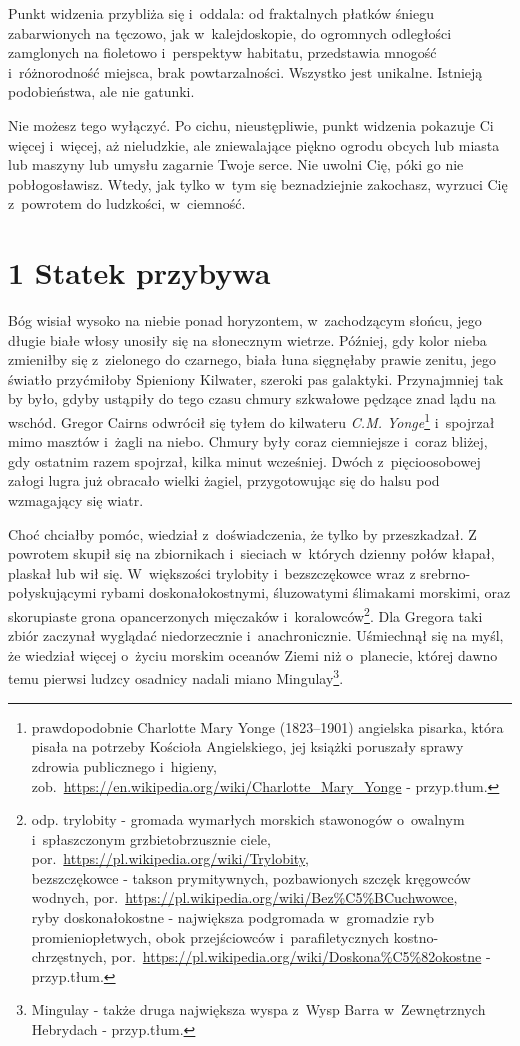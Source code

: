 \documentclass[oneside,polish,12pt,sfheadings]{mwbk}
\begin{document}
Punkt widzenia przybliża się i~oddala: od fraktalnych płatków śniegu
zabarwionych na tęczowo, jak w~kalejdoskopie, do ogromnych odległości
zamglonych na fioletowo i~perspektyw habitatu, przedstawia mnogość i~różnorodność miejsca, brak powtarzalności. Wszystko jest unikalne.
Istnieją podobieństwa, ale nie gatunki.

Nie możesz tego wyłączyć. Po cichu, nieustępliwie, punkt widzenia
pokazuje Ci więcej i~więcej, aż nieludzkie, ale zniewalające piękno
ogrodu obcych lub miasta lub maszyny lub umysłu zagarnie Twoje serce.
Nie uwolni Cię, póki go nie pobłogosławisz. Wtedy, jak tylko w~tym się
beznadziejnie zakochasz, wyrzuci Cię z~powrotem do ludzkości, w~ciemność.

\chapter[Statek przybywa]{1 Statek przybywa}

Bóg wisiał wysoko na niebie ponad horyzontem, w~zachodzącym słońcu, jego
długie białe włosy unosiły się na słonecznym wietrze. Później, gdy kolor
nieba zmieniłby się z~zielonego do czarnego, biała łuna sięgnęłaby
prawie zenitu, jego światło przyćmiłoby Spieniony Kilwater, szeroki pas
galaktyki. Przynajmniej tak by było, gdyby ustąpiły do tego czasu chmury
szkwałowe pędzące znad lądu na wschód. Gregor Cairns odwrócił się tyłem do
kilwateru \emph{C.M. Yonge}\footnote{prawdopodobnie Charlotte Mary Yonge (1823–1901) angielska pisarka, która pisała na potrzeby Kościoła Angielskiego, jej książki poruszały sprawy zdrowia publicznego i~higieny, zob.~\url{https://en.wikipedia.org/wiki/Charlotte_Mary_Yonge} - przyp.tłum.} i~spojrzał mimo masztów i~żagli na niebo.
Chmury były coraz ciemniejsze i~coraz bliżej, gdy ostatnim razem
spojrzał, kilka minut wcześniej. Dwóch z~pięcioosobowej załogi lugra już
obracało wielki żagiel, przygotowując się do halsu pod wzmagający się
wiatr.

Choć chciałby pomóc, wiedział z~doświadczenia, że tylko by przeszkadzał.
Z powrotem skupił się na zbiornikach i~sieciach w~których dzienny połów
kłapał, plaskał lub wił się. W~większości trylobity i~bezszczękowce wraz
z srebrno-połyskującymi rybami doskonałokostnymi, śluzowatymi ślimakami
morskimi, oraz skorupiaste grona opancerzonych mięczaków i~koralowców\footnote{odp. trylobity - gromada wymarłych
morskich stawonogów o~owalnym i~spłaszczonym grzbietobrzusznie ciele,
por.~\url{https://pl.wikipedia.org/wiki/Trylobity}, \\ bezszczękowce - takson
prymitywnych, pozbawionych szczęk kręgowców wodnych, por.~\url{https://pl.wikipedia.org/wiki/Bez\%C5\%BCuchwowce}, \\ ryby
doskonałokostne - największa podgromada w~gromadzie ryb
promieniopłetwych, obok przejściowców i~parafiletycznych
kostno-chrzęstnych, por.~\url{https://pl.wikipedia.org/wiki/Doskona\%C5\%82okostne} - przyp.tłum.}.
Dla Gregora taki zbiór zaczynał wyglądać niedorzecznie i~anachronicznie.
Uśmiechnął się na myśl, że wiedział więcej o~życiu morskim oceanów Ziemi
niż o~planecie, której dawno temu pierwsi ludzcy osadnicy nadali miano
Mingulay\footnote{Mingulay - także druga największa
wyspa z~Wysp Barra w~Zewnętrznych Hebrydach - przyp.tłum.}.
\end{document}
